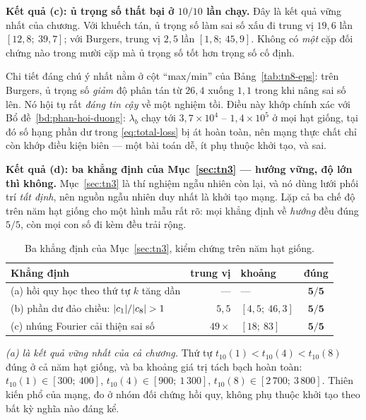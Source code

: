 \textbf{Kết quả (c): ủ trọng số thất bại ở $10/10$ lần chạy.} Đây là kết quả
vững nhất của chương. Với khuếch tán, ủ trọng số làm sai số xấu đi trung vị
$19{,}6$ lần $[12{,}8;\ 39{,}7]$; với Burgers, trung vị $2{,}5$ lần
$[1{,}8;\ 45{,}9]$. Không có \emph{một} cặp đối chứng nào trong mười cặp mà ủ
trọng số tốt hơn trọng số cố định.

Chi tiết đáng chú ý nhất nằm ở cột ``max/min'' của
Bảng~\ref{tab:tn8-eps}: trên Burgers, ủ trọng số \emph{giảm} độ phân tán từ
$26{,}4$ xuống $1{,}1$ trong khi nâng sai số lên. Nó hội tụ rất \emph{đáng tin
cậy} về một nghiệm tồi. Điều này khớp chính xác với
Bổ đề~\ref{bd:phan-hoi-duong}: $\lambda_b$ chạy tới $3{,}7\times10^{4}$ --
$1{,}4\times10^{5}$ ở mọi hạt giống, tại đó số hạng phần dư trong
\eqref{eq:total-loss} bị át hoàn toàn, nên mạng thực chất chỉ còn khớp điều kiện
biên --- một bài toán dễ, ít phụ thuộc khởi tạo, và sai.

\textbf{Kết quả (d): ba khẳng định của Mục~\ref{sec:tn3} --- hướng vững, độ lớn
thì không.} Mục~\ref{sec:tn3} là thí nghiệm ngẫu nhiên còn lại, và nó dùng lưới
phối trí \emph{tất định}, nên nguồn ngẫu nhiên duy nhất là khởi tạo mạng. Lặp cả
ba chế độ trên năm hạt giống cho một hình mẫu rất rõ: mọi khẳng định về
\emph{hướng} đều đúng $5/5$, còn mọi con số đi kèm đều trải rộng.

\begin{table}[H]
\centering
\caption[Ba khẳng định của Thí nghiệm 3 trên năm hạt giống]{Ba khẳng định của
Mục~\ref{sec:tn3}, kiểm chứng trên năm hạt giống.}
\label{tab:tn8-pho}
\small
\setlength{\tabcolsep}{5pt}
\begin{tabular}{@{}p{5.3cm} r l c@{}}
\toprule
\textbf{Khẳng định} & \textbf{trung vị} & \textbf{khoảng} & \textbf{đúng} \\
\midrule
(a) hồi quy học theo thứ tự $k$ tăng dần
  & --- & --- & $\mathbf{5/5}$ \\
(b) phần dư đảo chiều: $\lvert c_1\rvert/\lvert c_8\rvert > 1$
  & $5{,}5$ & $[4{,}5;\ 46{,}3]$ & $\mathbf{5/5}$ \\
(c) nhúng Fourier cải thiện sai số
  & $49\times$ & $[18;\ 83]$ & $\mathbf{5/5}$ \\
\bottomrule
\end{tabular}
\end{table}

\emph{(a) là kết quả vững nhất của cả chương.} Thứ tự $t_{10}(1) < t_{10}(4) <
t_{10}(8)$ đúng ở cả năm hạt giống, và ba khoảng giá trị tách bạch hoàn toàn:
$t_{10}(1) \in [300;\ 400]$, $t_{10}(4) \in [900;\ 1\,300]$,
$t_{10}(8) \in [2\,700;\ 3\,800]$. Thiên kiến phổ của mạng, đo ở nhóm đối
chứng hồi quy, không phụ thuộc khởi tạo theo bất kỳ nghĩa nào đáng kể.

